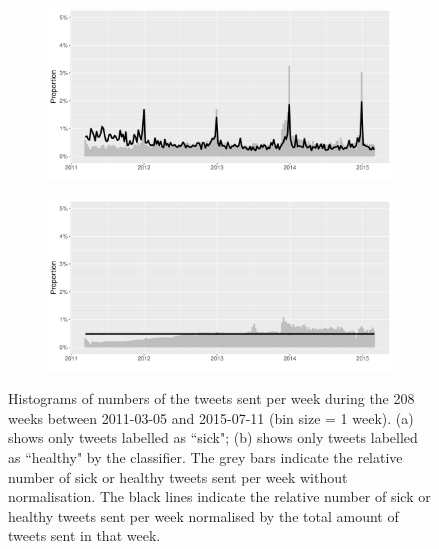 \documentclass[11pt, a4paper,twoside]{report}\usepackage[]{graphicx}\usepackage[]{color}
\begin{document}
\begin{figure}[htbp!]
\centering
  \begin{subfigure}[t]{1\textwidth}
  \includegraphics[width=1\linewidth]{12B_activity_sick_user_date_Twitter_full_aggregatedoverlay.pdf}
  \caption{}
  \end{subfigure}
  
  \bigskip 

    \begin{subfigure}[t]{1\textwidth}
  \includegraphics[width=1\linewidth]{13B_activity_healthy_user_date_Twitter_full_aggregatedoverlay.pdf}
  \caption{}
  \end{subfigure}
  \caption{Histograms of numbers of the tweets sent per week during the 208 weeks between 2011-03-05 and 2015-07-11 (bin size = 1 week). (a) shows only tweets labelled as ``sick"; (b) shows only tweets labelled as ``healthy" by the classifier. The grey bars indicate the relative number of sick or healthy tweets sent per week without normalisation. The black lines indicate the relative number of sick or healthy tweets sent per week normalised by the total amount of tweets sent in that week.}
  \label{fig:tweets_seasonal_healthy_sick_user}
\end{figure}
\end{document}
